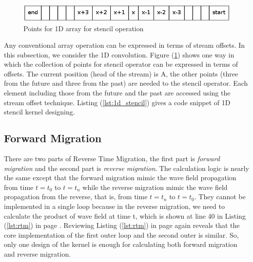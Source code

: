 \begin{figure}
  \centering
  \includegraphics[scale=0.5]{img/array.png}
  \caption{Points for 1D array for stencil operation}
  \label{fig:array}
\end{figure}

\begin{figure}
  
\end{figure}

Any conventional array operation can be expressed in terms of stream
offsets. In this subsection, we consider the 1D convolution. Figure
(\ref{fig:array}) shows one way in which the collection of points for
stencil operator can be expressed in terms of offsets. The current position
(head of the stream) is A, the other points (three from the future and
three from the past) are needed to the stencil operator. Each element
including those from the future and the past are accessed using the stream
offset technique. Listing (\ref{lst:1d_stencil}) gives a code snippet of 1D
stencil kernel designing.



\subsection{Forward Migration } %
\label{sub:Forward Migration }

There are two parts of Reverse Time Migration, the first part is
\emph{forward migration} and the second part is \emph{reverse migration}.
The calculation logic is nearly the same except that the forward migration
mimic the wave field propagation from time \( t=t_0 \) to \( t=t_n \) while
the reverse migration mimic the wave field propagation from the reverse,
that is, from time \( t = t_n \) to \( t = t_0 \). They cannot be
implemented in a single loop because in the reverse migration, we need to
calculate the product of wave field at time t, which is shown at line 40 in
Listing (\ref{lst:rtm}) in page \pageref{lst:rtm}. Reviewing Listing
(\ref{lst:rtm}) in page \pageref{lst:rtm} again reveals that the core
implementation of the first outer loop and the second outer is similar. So,
only one design of the kernel is enough for calculating both forward
migration and reverse migration.

